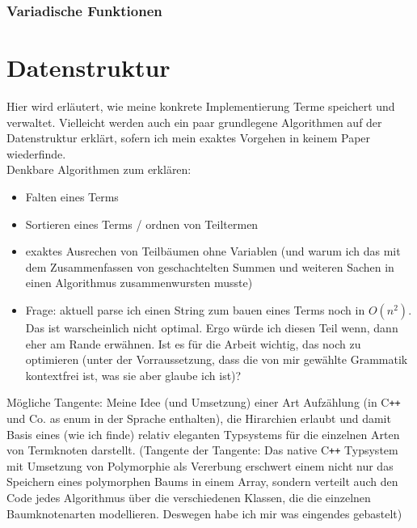\documentclass{article}
\begin{document}
\subsubsection{Variadische Funktionen}







\section{Datenstruktur}

Hier wird erläutert, wie meine konkrete Implementierung Terme speichert und verwaltet. Vielleicht werden auch ein paar grundlegene Algorithmen auf der Datenstruktur erklärt, sofern ich mein exaktes Vorgehen in keinem Paper wiederfinde.\\
Denkbare Algorithmen zum erklären:
\begin{itemize}
    \item Falten eines Terms
    \item Sortieren eines Terms / ordnen von Teiltermen
    \item exaktes Ausrechen von Teilbäumen ohne Variablen (und warum ich das mit dem Zusammenfassen von geschachtelten Summen und weiteren Sachen in einen Algorithmus zusammenwursten musste)
    \item Frage: aktuell parse ich einen String zum bauen eines Terms noch in $O(n^2)$. Das ist warscheinlich nicht optimal. Ergo würde ich diesen Teil wenn, dann eher am Rande erwähnen. Ist es für die Arbeit wichtig, das noch zu optimieren (unter der Vorraussetzung, dass die von mir gewählte Grammatik kontextfrei ist, was sie aber glaube ich ist)?
\end{itemize}

Mögliche Tangente: Meine Idee (und Umsetzung) einer Art Aufzählung (in C\texttt{++} und Co. as enum in der Sprache enthalten), die Hirarchien erlaubt und damit Basis eines (wie ich finde) relativ eleganten Typsystems für die einzelnen Arten von Termknoten darstellt. (Tangente der Tangente: Das native C\texttt{++} Typsystem mit Umsetzung von Polymorphie als Vererbung erschwert einem nicht nur das Speichern eines polymorphen Baums in einem Array, sondern verteilt auch den Code jedes Algorithmus über die verschiedenen Klassen, die die einzelnen Baumknotenarten modellieren. Deswegen habe ich mir was eingendes gebastelt)
~\\~
\end{document}
